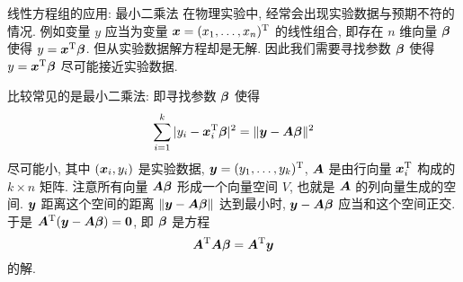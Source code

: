 \begin{frame}{线性方程组的应用: 最小二乘法\noexer}
	\onslide<+->
	在物理实验中, 经常会出现实验数据与预期不符的情况.
	\onslide<+->
	例如变量 $y$ 应当为变量 $\bfx=(x_1,\dots,x_n)^\rmT$ 的线性组合, 即存在 $n$ 维向量 $\bmb$ 使得 $y=\bfx^\rmT\bmb$.
	\onslide<+->
	但从实验数据解方程却是无解.
	因此我们需要寻找参数 $\bmb$ 使得 $y=\bfx^\rmT\bmb$ 尽可能接近实验数据.

	\onslide<+->
	比较常见的是最小二乘法: 即寻找参数 $\bmb$ 使得
	\[\sum_{i=1}^k |y_i-\bfx_i^\rmT\bmb|^2
	=\|\bfy-\bfA\bmb\|^2\]
	尽可能小, 其中 $(\bfx_i,y_i)$ 是实验数据, $\bfy=(y_1,\dots,y_k)^\rmT$, $\bfA$ 是由行向量 $\bfx_i^\rmT$ 构成的 $k\times n$ 矩阵.
	\onslide<+->
	注意所有向量 $\bfA\bmb$ 形成一个向量空间 $V$, 也就是 $\bfA$ 的列向量生成的空间.
	\onslide<+->
	$\bfy$ 距离这个空间的距离	$\|\bfy-\bfA\bmb\|$ 达到最小时, $\bfy-\bfA\bmb$ 应当和这个空间正交.
	\onslide<+->
	于是 $\bfA^\rmT(\bfy-\bfA\bmb)={\bf0}$, 即 $\bmb$ 是方程
	\[\bfA^\rmT\bfA\bmb=\bfA^\rmT\bfy\]
	的解.
\end{frame}



